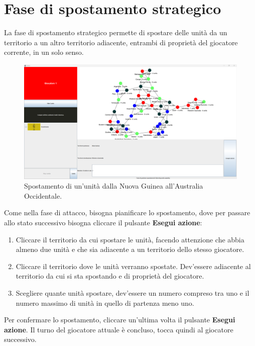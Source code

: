 \documentclass[a4paper,12pt]{report}
\begin{document}
\section{Fase di spostamento strategico}
La fase di spostamento strategico permette di spostare delle unità da un territorio a un altro territorio adiacente, entrambi di proprietà del giocatore corrente, in un solo senso.

\begin{figure}[H]
	\centering
	\includegraphics[width=1\textwidth]{user_guide/12_final_move_before.png}
	\caption{Spostamento di un'unità dalla Nuova Guinea all'Australia Occidentale.}
\end{figure}

Come nella fase di attacco, bisogna pianificare lo spostamento, dove per passare allo stato successivo bisogna cliccare il pulsante \textbf{Esegui azione}:
\begin{enumerate}
	\item Cliccare il territorio da cui spostare le unità, facendo attenzione che abbia almeno due unità e che sia adiacente a un territorio dello stesso giocatore.
	\item Cliccare il territorio dove le unità verranno spostate. Dev'essere adiacente al territorio da cui si sta spostando e di proprietà del giocatore.
	\item Scegliere quante unità spostare, dev'essere un numero compreso tra uno e il numero massimo di unità in quello di partenza meno uno.
\end{enumerate}

Per confermare lo spostamento, cliccare un'ultima volta il pulsante \textbf{Esegui azione}.
Il turno del giocatore attuale è concluso, tocca quindi al giocatore successivo.
\end{document}
